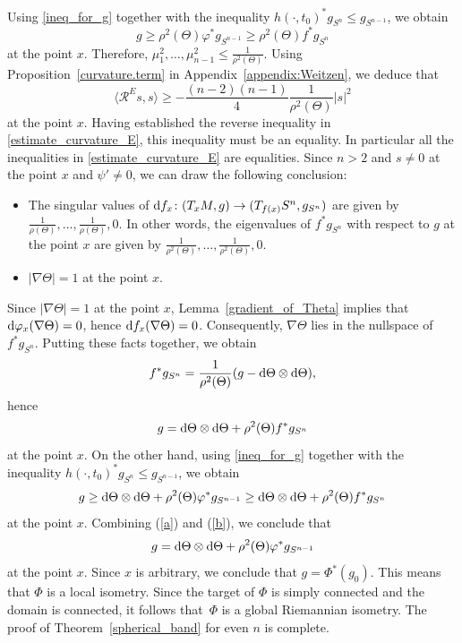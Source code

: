 \documentclass[11pt]{article}
\numberwithin{equation}{section}
\numberwithin{equation}{section}
\begin{document}
Using \eqref{ineq_for_g} together with the inequality $h(\cdot,t_0)^* g_{S^n} \leq g_{S^{n-1}}$, we obtain
\[g \geq \rho^2(\Theta) \varphi^* g_{S^{n-1}} \geq \rho^2(\Theta) f^* g_{S^n}\]
at the point $x$.
Therefore, $\mu_1^2,\hdots,\mu_{n-1}^2 \leq \frac{1}{\rho^2(\Theta)}$.
Using Proposition~\ref{curvature.term} in Appendix~\ref{appendix:Weitzen}, we deduce that
\[
 \big\langle \mathcal{R}^E s ,s \big\rangle \geq -\frac{(n-2)(n-1)}{4} \frac{1}{\rho^2(\Theta)} |s|^2
\]
at the point $x$.
Having established the reverse inequality in \eqref{estimate_curvature_E}, this inequality must be an equality.
In particular all the inequalities in \eqref{estimate_curvature_E} are equalities.
Since $n>2$ and $s \neq 0$ at the point $x$ and $\psi'\neq0$, we can draw the following conclusion:
\begin{itemize}\itemsep=0pt
\item The singular values of ${\rm d}f_x\colon (T_x M,g) \to (T_{f(x)} S^n,g_{S^n})$ are given by $\frac{1}{\rho(\Theta)}, \ldots, \frac{1}{\rho(\Theta)}, 0$. In other words, the eigenvalues of $f^* g_{S^n}$ with respect to $g$ at the point $x$ are given by $\frac{1}{\rho^2(\Theta)}, \ldots, \frac{1}{\rho^2(\Theta)}, 0$.
\item $|\nabla \Theta| = 1$ at the point $x$.
\end{itemize}
Since $|\nabla \Theta| = 1$ at the point $x$, Lemma~\ref{gradient_of_Theta} implies that ${\rm d}\varphi_x(\nabla \Theta) = 0$, hence ${\rm d}f_x(\nabla \Theta) = 0$.
Consequently, $\nabla \Theta$ lies in the nullspace of $f^* g_{S^n}$. Putting these facts together, we obtain
\[f^* g_{S^n} = \frac{1}{\rho^2(\Theta)} (g - {\rm d}\Theta \otimes{\rm d}\Theta),\]
hence
\begin{equation}
\label{a}
g = {\rm d}\Theta \otimes {\rm d}\Theta + \rho^2(\Theta) f^* g_{S^n}
\end{equation}
at the point $x$. On the other hand, using \eqref{ineq_for_g} together with the inequality $h(\cdot,t_0)^* g_{S^n} \leq g_{S^{n-1}}$, we obtain
\begin{equation}
\label{b}
g \geq {\rm d}\Theta \otimes {\rm d}\Theta + \rho^2(\Theta) \varphi^* g_{S^{n-1}} \geq {\rm d}\Theta \otimes {\rm d}\Theta + \rho^2(\Theta) f^* g_{S^n}
\end{equation}
at the point $x$. Combining (\ref{a}) and (\ref{b}), we conclude that
\[g = {\rm d}\Theta \otimes {\rm d}\Theta + \rho^2(\Theta) \varphi^* g_{S^{n-1}}\]
at the point $x$. Since $x$ is arbitrary, we conclude that $g= \Phi^*(g_0)$.
This means that $\Phi$ is a local isometry.
Since the target of $\Phi$ is simply connected and the domain is connected, it follows that~$\Phi$ is a global Riemannian isometry.
The proof of Theorem~\ref{spherical_band} for even $n$ is complete.
\end{document}
